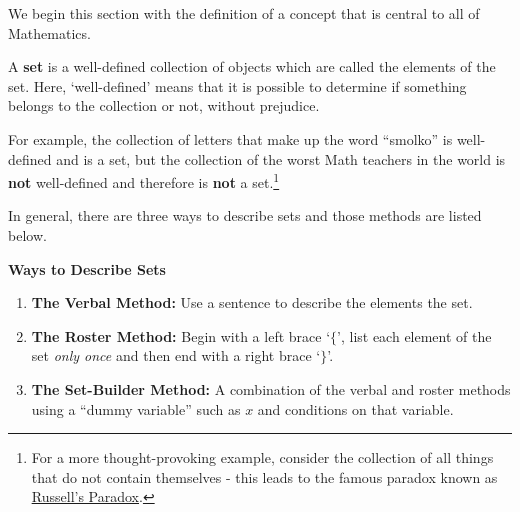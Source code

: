\documentclass{ximera}
\begin{document}
We begin this section with the definition of a concept that is central to all of Mathematics.

 


\begin{definition} \label{setdef}

A \textbf{set} is a well-defined collection of objects which are called the elements of the set.  Here, `well-defined' means that it is possible to determine if something belongs to the collection or not, without prejudice. 

\end{definition}


 

For example, the collection of letters that make up the word ``smolko'' is well-defined and is a set, but the collection of the worst Math teachers in the world is \textbf{not} well-defined and therefore is \textbf{not} a set.\footnote{For a more thought-provoking example, consider the collection of all things that do not contain themselves - this leads to the famous paradox known as \href{http://en.wikipedia.org/wiki/Russell's_paradox}{\underline{Russell's Paradox}}.}  

In general, there are three ways to describe sets and those methods are listed below.

 
\label{waystodescribesets}


\centerline{\textbf{Ways to Describe Sets}}

\begin{enumerate}

\item \textbf{The Verbal Method:} Use a sentence to describe the elements the set.

\item \textbf{The Roster Method:}  Begin with a left brace `$\{$', list each element of the set \textit{only once} and then end with a right brace `$\}$'.

\item \textbf{The Set-Builder Method:} A combination of the verbal and roster methods using a ``dummy variable'' such as $x$ and conditions on that variable.

\end{enumerate}
\end{document}
